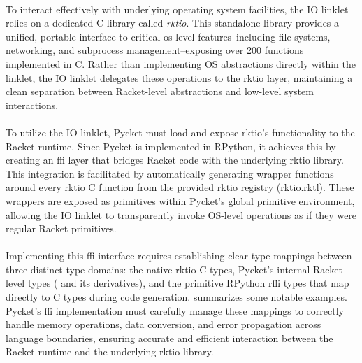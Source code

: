 				\paragraph{}%
					To interact effectively with underlying operating system facilities, the IO linklet relies on a dedicated C library called \emph{rktio}. This standalone library provides a unified, portable interface to critical \gls{os}-level features--including file systems, networking, and subprocess management--exposing over 200 functions implemented in C. Rather than implementing OS abstractions directly within the linklet, the IO linklet delegates these operations to the rktio layer, maintaining a clean separation between Racket-level abstractions and low-level system interactions.

				\paragraph{}%
					To utilize the IO linklet, Pycket must load and expose rktio’s functionality to the Racket runtime. Since Pycket is implemented in RPython, it achieves this by creating an \gls{ffi} layer that bridges Racket code with the underlying rktio library. This integration is facilitated by automatically generating wrapper functions around every rktio C function from the provided rktio registry (rktio.rktl). These wrappers are exposed as primitives within Pycket’s global primitive environment, allowing the IO linklet to transparently invoke OS-level operations as if they were regular Racket primitives.

				\paragraph{}%
					Implementing this \gls{ffi} interface requires establishing clear type mappings between three distinct type domains: the native rktio C types, Pycket’s internal Racket-level types ( and its derivatives), and the primitive RPython rffi types that map directly to C types during code generation.  summarizes some notable examples. Pycket’s \gls{ffi} implementation must carefully manage these mappings to correctly handle memory operations, data conversion, and error propagation across language boundaries, ensuring accurate and efficient interaction between the Racket runtime and the underlying rktio library.


